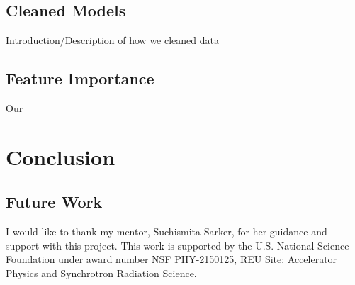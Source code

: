 \documentclass[twocolumn, nofootinbib, secnumarabic, amssymb, nobibnotes, aps, prd]{revtex4-2}
\begin{document}
\subsection{Cleaned Models} %
Introduction/Description of how we cleaned data

\subsection{Feature Importance}
Our 

\section{Conclusion}
\subsection{Future Work}

\begin{acknowledgments}
I would like to thank my mentor, Suchismita Sarker, for her guidance and support with this project. This work is supported by the U.S. National Science Foundation under award number NSF PHY-2150125, REU Site: Accelerator Physics and Synchrotron Radiation Science.
\end{acknowledgments}



\end{document}

